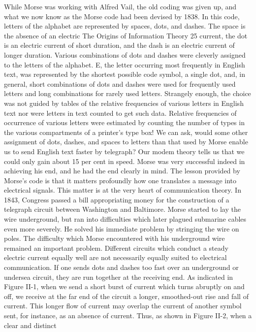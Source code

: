 While Morse was working with Alfred Vail, the old coding was
given up, and what we now know as the Morse code had been
devised by 1838. In this code, letters of the alphabet are represented
by spaces, dots, and dashes. The space is the absence of an electric
The Origins of Information Theory
25
current, the dot is an electric current of short duration, and the
dash is an electric current of longer duration.
Various combinations of dots and dashes were cleverly assigned
to the letters of the alphabet. E, the letter occurring most frequently
in English text, was represented by the shortest possible code
symbol, a single dot, and, in general, short combinations of dots
and dashes were used for frequently used letters and long combinations
for rarely used letters. Strangely enough, the choice was
not guided by tables of the relative frequencies of various letters
in English text nor were letters in text counted to get such data.
Relative frequencies of occurrence of various letters were estimated
by counting the number of types in the various compartments of
a printer’s type box!
We can ask, would some other assignment of dots, dashes, and
spaces to letters than that used by Morse enable us to send English
text faster by telegraph? Our modem theory tells us that we could
only gain about 15 per cent in speed. Morse was very successful
indeed in achieving his end, and he had the end clearly in mind.
The lesson provided by Morse’s code is that it matters profoundly
how one translates a message into electrical signals. This matter
is at the very heart of communication theory.
In 1843, Congress passed a bill appropriating money for the
construction of a telegraph circuit between Washington and Baltimore.
Morse started to lay the wire underground, but ran into
difficulties which later plagued submarine cables even more
severely. He solved his immediate problem by stringing the wire
on poles.
The difficulty which Morse encountered with his underground
wire remained an important problem. Different circuits which
conduct a steady electric current equally well are not necessarily
equally suited to electrical communication. If one sends dots and
dashes too fast over an underground or undersea circuit, they are
run together at the receiving end. As indicated in Figure II-1,
when we send a short burst of current which turns abruptly on and
off, we receive at the far end of the circuit a longer, smoothed-out
rise and fall of current. This longer flow of current may overlap
the current of another symbol sent, for instance, as an absence of
current. Thus, as shown in Figure II-2, when a clear and distinct
